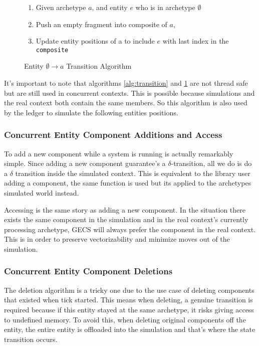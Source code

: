 \begin{figure}[H]
\begin{enumerate}
    \item Given archetype $a$, and entity $e$ who is in archetype $\emptyset$ 
    \item Push an empty fragment into composite of $a$,
    \item Update entity positions of a to include $e$ with last index in the \texttt{composite}
\end{enumerate}
\caption{Entity $\emptyset \rightarrow a$ Transition Algorithm}
\label{alg:empty_to_a}
\end{figure}

It's important to note that algorithms \ref{alg:transition} and \ref{alg:empty_to_a} are not thread safe but are still used in concurrent contexts. This is possible because simulations and the real context both contain the same members. So this algorithm is also used by the ledger to simulate the following entities positions.

\subsubsection{Concurrent Entity Component Additions and Access}
To add a new component while a system is running is actually remarkably simple. Since adding a new component guarantee's a $\delta$-transition, all we do is do a $\delta$ transition inside the simulated context. This is equivalent to the library user adding a component, the same function is used but its applied to the archetypes simulated world instead. 

Accessing is the same story as adding a new component. In the situation there exists the same component in the simulation and in the real context's currently processing archetype, GECS will always prefer the component in the real context. This is in order to preserve vectorizability and minimize moves out of the simulation.

\subsubsection{Concurrent Entity Component Deletions}
The deletion algorithm is a tricky one due to the use case of deleting components that existed when tick started. This means when deleting, a genuine transition is required because if this entity stayed at the same archetype, it risks giving access to undefined memory. To avoid this, when deleting original components off the entity, the entire entity is offloaded into the simulation and that's where the state transition occurs. 

